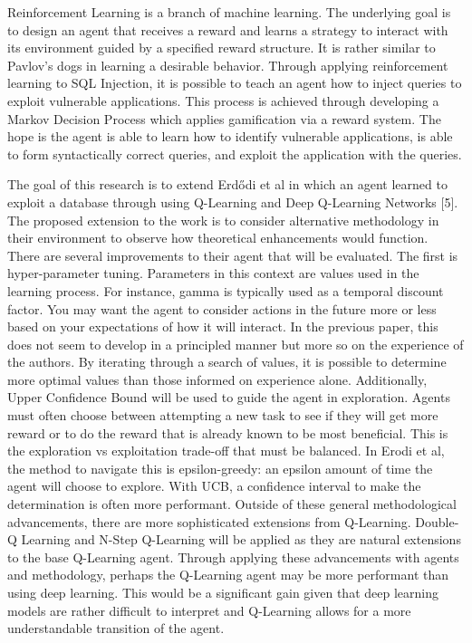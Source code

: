 \documentclass[conference]{IEEEtran}
\begin{document}
Reinforcement Learning is a branch of machine learning. The underlying goal is to design an agent that receives a reward and learns a strategy to interact with its environment guided by a specified reward structure. It is rather similar to Pavlov’s dogs in learning a desirable behavior. Through applying reinforcement learning to SQL Injection, it is possible to teach an agent how to inject queries to exploit vulnerable applications. This process is achieved through developing a Markov Decision Process which applies gamification via a reward system. The hope is the agent is able to learn how to identify vulnerable applications, is able to form syntactically correct queries, and exploit the application with the queries. 
\vspace{1mm} %


The goal of this research is to extend Erdődi et al in which an agent learned to exploit a database through using Q-Learning and Deep Q-Learning Networks [5]. The proposed extension to the work is to consider alternative methodology in their environment to observe how theoretical enhancements would function. There are several improvements to their agent that will be evaluated. The first is hyper-parameter tuning. Parameters in this context are values used in the learning process. For instance, gamma is typically used as a temporal discount factor. You may want the agent to consider actions in the future more or less based on your expectations of how it will interact. In the previous paper, this does not seem to develop in a principled manner but more so on the experience of the authors. By iterating through a search of values, it is possible to determine more optimal values than those informed on experience alone. Additionally, Upper Confidence Bound will be used to guide the agent in exploration. Agents must often choose between attempting a new task to see if they will get more reward or to do the reward that is already known to be most beneficial. This is the exploration vs exploitation trade-off that must be balanced. In Erodi et al, the method to navigate this is epsilon-greedy: an epsilon amount of time the agent will choose to explore. With UCB, a confidence interval to make the determination is often more performant. Outside of these general methodological advancements, there are more sophisticated extensions from Q-Learning. Double-Q Learning and N-Step Q-Learning will be applied as they are natural extensions to the base Q-Learning agent. Through applying these advancements with agents and methodology, perhaps the Q-Learning agent may be more performant than using deep learning. This would be a significant gain given that deep learning models are rather difficult to interpret and Q-Learning allows for a more understandable transition of the agent. 
\end{document}
